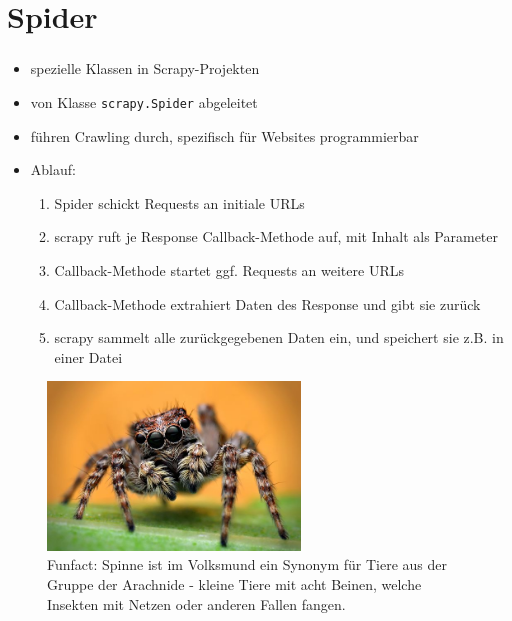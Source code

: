 \documentclass{beamer}
\begin{document}
\section{Spider}
\begin{frame}[fragile]
	\frametitle{\insertsection}
	\begin{itemize}
		\item spezielle Klassen in Scrapy-Projekten
		\item von Klasse \verb|scrapy.Spider| abgeleitet
		\item führen Crawling durch, spezifisch für Websites programmierbar
		\item Ablauf: \begin{enumerate}		
			\item Spider schickt Requests an initiale URLs
			\item scrapy ruft je Response Callback-Methode auf, mit Inhalt als Parameter
			\item Callback-Methode startet ggf. Requests an weitere URLs
			\item Callback-Methode extrahiert Daten des Response und gibt sie zurück
			\item scrapy sammelt alle zurückgegebenen Daten ein, und speichert sie z.B. in einer Datei
		\end{enumerate}
	\end{itemize}
\end{frame}
\begin{frame}[fragile]
	\framebreak
	
	\begin{figure}
		\begin{center}
			\includegraphics[width=0.6\textwidth]{texsrc/Spider_cute}
		\end{center}
		\caption{Funfact: Spinne ist im Volksmund ein Synonym für Tiere aus der Gruppe
		der Arachnide - kleine Tiere mit acht Beinen, welche Insekten mit Netzen oder
		anderen Fallen fangen.}
		\label{fig:Spider}
	\end{figure}
\end{frame}
\end{document}
